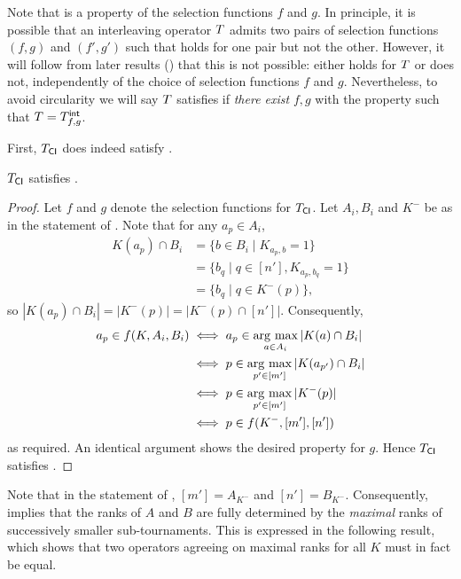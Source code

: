 Note that \smi{} is a property of the selection functions $f$ and $g$.
In principle, it is possible that an interleaving operator $T$ admits two
pairs of selection functions $(f, g)$ and $(f', g')$ such that \smi{}
holds for one pair but not the other. However, it will follow from later
results () that this is not possible:
\smi{} either holds for $T$ or does not, independently of the choice
of selection functions $f$ and $g$. Nevertheless, to avoid circularity we will
say $T$ satisfies \smi{} if \emph{there exist} $f, g$ with the
\smi{} property such that $T = {T_{f, g}^\mathsf{int}}$.

First, ${T_{\mathsf{CI}}}$ does indeed satisfy \smi{}.

\begin{proposition}
    \label{tourn_result_tcardint_smi}
    ${T_{\mathsf{CI}}}$ satisfies \smi{}.
\end{proposition}

\begin{proof}
    Let $f$ and $g$ denote the selection functions for ${T_{\mathsf{CI}}}$. Let $A_i,
    B_i$ and $K^-$ be as in the statement of \smi{}. Note that for any
    $a_p \in A_i$,
    \begin{align*}
        K(a_p) \cap B_i
        &= \{b \in B_i \mid K_{a_p,b} = 1\} \\
        &= \{b_q \mid q \in [n'], K_{a_p, b_q} = 1\} \\
        &= \{b_q \mid q \in K^-(p)\},
    \end{align*}
    so $|K(a_p) \cap B_i| = |K^-(p)| = |K^-(p) \cap [n']|$. Consequently,
    \begin{align*}
        a_p \in f(K, A_i, B_i)
        &\iff a_p \in \operatorname*{arg\ max}_{a \in A_i}{|K(a) \cap B_i|} \\
        &\iff p \in \operatorname*{arg\ max}_{p' \in [m']}{|K(a_{p'}) \cap B_i|} \\
        &\iff p \in \operatorname*{arg\ max}_{p' \in [m']}{|K^-(p)|} \\
        &\iff p \in f(K^-, [m'], [n'])
    \end{align*}
    as required. An identical argument shows the desired property for $g$.
    Hence ${T_{\mathsf{CI}}}$ satisfies \smi{}.
\end{proof}

Note that in the statement of \smi{}, $[m'] = A_{K^-}$ and $[n'] =
B_{K^-}$. Consequently, \smi{} implies that the ranks of $A$ and $B$
are fully determined by the \emph{maximal} ranks of successively smaller
sub-tournaments. This is expressed in the following result, which shows that
two \smi{} operators agreeing on maximal ranks for all $K$ must in fact
be equal.

